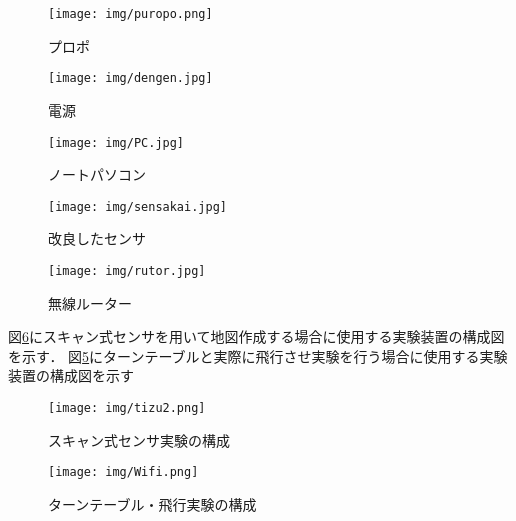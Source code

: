 \documentclass[12pt,oneside]{sotsuken_paper}
\begin{document}
\begin{figure}[H]
\begin{center}
\texttt{[image: img/puropo.png]}
\end{center}
\caption{プロポ}
\label{fig:puropo}
\end{figure}

\begin{figure}[H]
\begin{center}
\texttt{[image: img/dengen.jpg]}
\end{center}
\caption{電源}
\label{fig:dengen}
\end{figure}

\begin{figure}[H]
\begin{center}
\texttt{[image: img/PC.jpg]}
\end{center}
\caption{ノートパソコン}
\label{fig:PC}
\end{figure}

\begin{figure}[H]
\begin{center}
\texttt{[image: img/sensakai.jpg]}
\end{center}
\caption{改良したセンサ}
\label{fig:sensakai}
\end{figure}

\begin{figure}[H]
\begin{center}
\texttt{[image: img/rutor.jpg]}
\end{center}
\caption{無線ルーター}
\label{fig:rutor}
\end{figure}

図\ref{fig:tizu2}にスキャン式センサを用いて地図作成する場合に使用する実験装置の構成図を示す．
図\ref{fig:rutor}にターンテーブルと実際に飛行させ実験を行う場合に使用する実験装置の構成図を示す

\begin{figure}[H]
\begin{center}
\texttt{[image: img/tizu2.png]}
\end{center}
\caption{スキャン式センサ実験の構成}
\label{fig:tizu2}
\end{figure}

\begin{figure}[H]
\begin{center}
\texttt{[image: img/Wifi.png]}
\end{center}
\caption{ターンテーブル・飛行実験の構成}
\label{fig:Wifi}
\end{figure}
\end{document}
